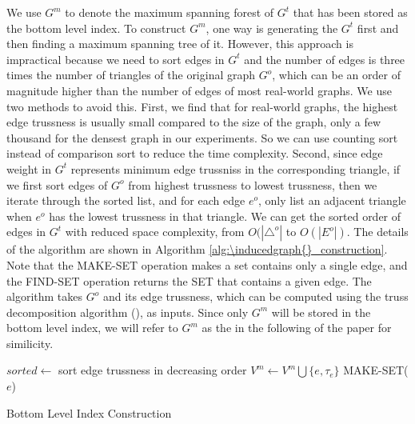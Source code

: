 We use $G^m$ to denote the maximum spanning forest of $G^t$ that has been stored as the bottom level index. To construct $G^m$, one way is generating the \inducedgraph{} $G^t$ first and then finding a maximum spanning tree of it. However, this approach is impractical because we need to sort edges in $G^t$ and the number of edges is three times the number of triangles of the original graph $G^o$, which can be an order of magnitude higher than the number of edges of most real-world graphs. We use two methods to avoid this. First, we find that for real-world graphs, the highest edge trussness is usually small compared to the size of the graph, \eg only a few thousand for the densest graph in our experiments. So we can use counting sort instead of comparison sort to reduce the time complexity. Second, since edge weight in $G^t$ represents minimum edge trussniss in the corresponding triangle, if we first sort edges of $G^o$ from highest trussness to lowest trussness, then we iterate through the sorted list, and for each edge $e^o$, only list an adjacent triangle when $e^o$ has the lowest trussness in that triangle. We can get the sorted order of edges in $G^t$ with reduced space complexity, from $O(|{\triangle}^o|$ to $O({|E^o|})$.
The details of the algorithm are shown in Algorithm \ref{alg:\inducedgraph{}_construction}. Note that the MAKE-SET operation makes a set contains only a single edge, and the FIND-SET operation returns the SET that contains a given edge.%
The algorithm takes $G^o$ and its edge trussness, which can be computed using the truss decomposition algorithm (\cite{wang2012truss}), as inputs. Since only $G^m$ will be stored in the bottom level index, we will refer to $G^m$ as the \inducedgraph{} in the following of the paper for similicity.

\begin{algorithm}
	\BlankLine
	$sorted \gets$ sort edge trussness in decreasing order\;
	 {
	   $V^{m} \gets V^{m} \bigcup \{e, \tau_{e}\}$\;
		 MAKE-SET($e$)\;
	}
	\caption{Bottom Level Index Construction}\label{alg:\inducedgraph{}_construction}
\end{algorithm}

